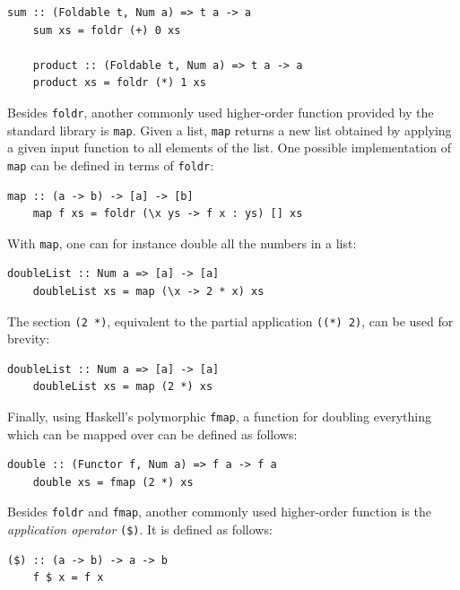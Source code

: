 \documentclass[UdineBachThesis,american,11pt]{PhdThesis}
\begin{document}
  \begin{Verbatim}[gobble=4,fontsize=\small]
    sum :: (Foldable t, Num a) => t a -> a
    sum xs = foldr (+) 0 xs

    product :: (Foldable t, Num a) => t a -> a
    product xs = foldr (*) 1 xs
  \end{Verbatim}

  Besides \mbox{\texttt{foldr}}, another commonly used higher-order function
  provided by the standard library is \mbox{\texttt{map}}. Given a list,
  \mbox{\texttt{map}} returns a new list obtained by applying a given input
  function to all elements of the list. One possible implementation of
  \mbox{\texttt{map}} can be defined in terms of \mbox{\texttt{foldr}}:

  \begin{Verbatim}[gobble=4,fontsize=\small]
    map :: (a -> b) -> [a] -> [b]
    map f xs = foldr (\x ys -> f x : ys) [] xs
  \end{Verbatim}

  With \mbox{\texttt{map}}, one can for instance double all the numbers in a
  list:

  \begin{Verbatim}[gobble=4,fontsize=\small]
    doubleList :: Num a => [a] -> [a]
    doubleList xs = map (\x -> 2 * x) xs
  \end{Verbatim}

  The section \mbox{\texttt{(2 *)}}, equivalent to the partial application
  \mbox{\texttt{((*) 2)}}, can be used for brevity:

  \begin{Verbatim}[gobble=4,fontsize=\small]
    doubleList :: Num a => [a] -> [a]
    doubleList xs = map (2 *) xs
  \end{Verbatim}

  Finally, using Haskell's polymorphic \mbox{\texttt{fmap}}, a function for
  doubling everything which can be mapped over can be defined as follows:

  \begin{Verbatim}[gobble=4,fontsize=\small]
    double :: (Functor f, Num a) => f a -> f a
    double xs = fmap (2 *) xs
  \end{Verbatim}

  Besides \mbox{\texttt{foldr}} and \mbox{\texttt{fmap}}, another commonly used
  higher-order function is the \emph{application operator} \mbox{\texttt{(\$)}}.
  It is defined as follows:

  \begin{Verbatim}[gobble=4,fontsize=\small]
    ($) :: (a -> b) -> a -> b
    f $ x = f x
  \end{Verbatim}
\end{document}
